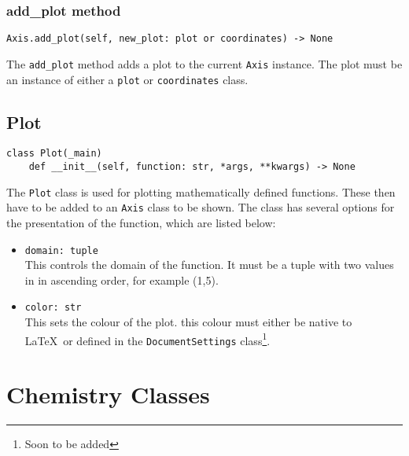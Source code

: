 \documentclass{article}
\begin{document}
\subsubsection{add\_plot method}\label{subsubsec:add_plot_method}
\begin{verbatim}
Axis.add_plot(self, new_plot: plot or coordinates) -> None
\end{verbatim}
The \verb|add_plot| method adds a plot to the current \verb|Axis| instance. The plot must be an instance of either a \verb|plot| or \verb|coordinates| class.
\subsection{Plot}\label{subsec:plot}
\begin{verbatim}
class Plot(_main)
	def __init__(self, function: str, *args, **kwargs) -> None
\end{verbatim}
The \verb|Plot| class is used for plotting mathematically defined functions. These then have to be added to an \verb|Axis| class to be shown. The class has several options for the presentation of the function, which are listed below:\begin{itemize}
\item \verb|domain: tuple|\\This controls the domain of the function. It must be a tuple with two values in in ascending order, for example (1,5).
\item \verb|color: str|\\This sets the colour of the plot. this colour must either be native to \LaTeX\ or defined in the \verb|DocumentSettings| class\footnote{Soon to be added}.
\end{itemize}

\section{Chemistry Classes}\label{sec:chemistry_classes}
\end{document}
